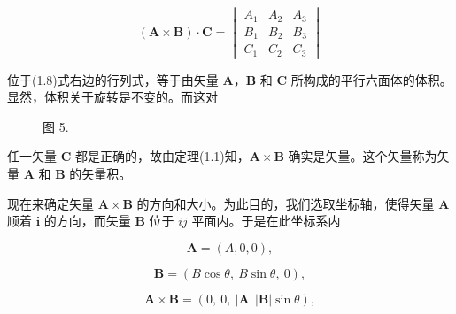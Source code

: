 \documentclass[11pt,a4paper,oneside]{ctexbook}
\newcommand{\ve}[1]{\bm{#1}}
\begin{document}
\begin{equation}
(\ve{A} \times \ve{B}) \cdot \ve{C} =
\begin{vmatrix}
A_1 & A_2 & A_3\\
B_1 & B_2 & B_3\\
C_1 & C_2 & C_3
\end{vmatrix}
\tag{1.8}
\end{equation}

位于(1.8)式右边的行列式，等于由矢量 $\ve{A}$，$\ve{B}$ 和 $\ve{C}$ 所构成的平行六面体的体积。显然，体积关于旋转是不变的。而这对

\begin{figure}[htbp]
\centering
{}
\par\vspace{2pt}
{\small 图 5.}
\end{figure}

任一矢量 $\ve{C}$ 都是正确的，故由定理(1.1)知，$\ve{A} \times \ve{B}$ 确实是矢量。这个矢量称为矢量 $\ve{A}$ 和 $\ve{B}$ 的矢量积。

现在来确定矢量 $\ve{A} \times \ve{B}$ 的方向和大小。为此目的，我们选取坐标轴，使得矢量 $\ve{A}$ 顺着 $\ve{i}$ 的方向，而矢量 $\ve{B}$ 位于 $ij$ 平面内。于是在此坐标系内

\begin{equation*}
\ve{A} = (A, 0, 0),
\end{equation*}

\begin{equation*}
\ve{B} = (B \cos\theta,\ B \sin\theta,\ 0),
\end{equation*}

\begin{equation*}
\ve{A} \times \ve{B} = (0,\ 0,\ |\ve{A}|\,|\ve{B}| \sin\theta),
\end{equation*}
\end{document}
